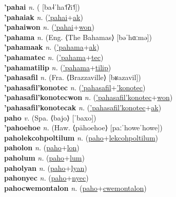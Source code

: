 \textbf{'pahai} \textit{n.} ( [ba˨ˈha˦ʔi˦])
 \label{'pahai} \\
\textbf{'pahaiak} \textit{n.} (\hyperref['pahai]{'pahai}+\hyperref[ak]{ak})
 \label{'pahaiak} \\
\textbf{'pahaiwon} \textit{n.} (\hyperref['pahai]{'pahai}+\hyperref[won]{won})
 \label{'pahaiwon} \\
\textbf{'pahama} \textit{n.} (Eng. ⟨The Bahamas⟩ [bəˈhɑːmə])
 \label{'pahama} \\
\textbf{'pahamaak} \textit{n.} (\hyperref['pahama]{'pahama}+\hyperref[ak]{ak})
 \label{'pahamaak} \\
\textbf{'pahamatec} \textit{n.} (\hyperref['pahama]{'pahama}+\hyperref[tec]{tec})
 \label{'pahamatec} \\
\textbf{'pahamatilip} \textit{n.} (\hyperref['pahama]{'pahama}+\hyperref[tilip]{tilip})
 \label{'pahamatilip} \\
\textbf{'pahasafil} \textit{n.} (Fra. ⟨Brazzaville⟩ [bʁazavil])
 \label{'pahasafil} \\
\textbf{'pahasafil'konotec} \textit{n.} (\hyperref['pahasafil]{'pahasafil}+\hyperref['konotec]{'konotec})
 \label{'pahasafil'konotec} \\
\textbf{'pahasafil'konotecwon} \textit{n.} (\hyperref['pahasafil'konotec]{'pahasafil'konotec}+\hyperref[won]{won})
 \label{'pahasafil'konotecwon} \\
\textbf{'pahasafil'konotecak} \textit{n.} (\hyperref['pahasafil'konotec]{'pahasafil'konotec}+\hyperref[ak]{ak})
 \label{'pahasafil'konotecak} \\
\textbf{paho} \textit{v.} (Spa. ⟨bajo⟩ [ˈbaxo])
 \label{paho} \\
\textbf{'pahoehoe} \textit{n.} (Haw. ⟨pāhoehoe⟩ [paːˈhoweˈhowe])
 \label{'pahoehoe} \\
\textbf{paholekcohpoltilum} \textit{n.} (\hyperref[paho]{paho}+\hyperref[lekcohpoltilum]{lekcohpoltilum})
 \label{paholekcohpoltilum} \\
\textbf{paholon} \textit{n.} (\hyperref[paho]{paho}+\hyperref[lon]{lon})
 \label{paholon} \\
\textbf{paholum} \textit{n.} (\hyperref[paho]{paho}+\hyperref[lum]{lum})
 \label{paholum} \\
\textbf{paholyan} \textit{n.} (\hyperref[paho]{paho}+\hyperref[lyan]{lyan})
 \label{paholyan} \\
\textbf{pahonyec} \textit{n.} (\hyperref[paho]{paho}+\hyperref[nyec]{nyec})
 \label{pahonyec} \\
\textbf{pahocwemontalon} \textit{n.} (\hyperref[paho]{paho}+\hyperref[cwemontalon]{cwemontalon})
